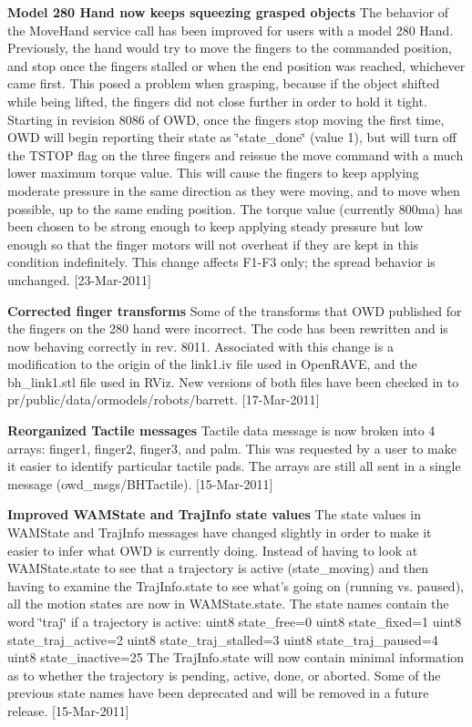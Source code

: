 {\bfseries Model 280 Hand now keeps squeezing grasped objects} The behavior of the Move\-Hand service call has been improved for users with a model 280 Hand. Previously, the hand would try to move the fingers to the commanded position, and stop once the fingers stalled or when the end position was reached, whichever came first. This posed a problem when grasping, because if the object shifted while being lifted, the fingers did not close further in order to hold it tight. Starting in revision 8086 of O\-W\-D, once the fingers stop moving the first time, O\-W\-D will begin reporting their state as \char`\"{}state\-\_\-done\char`\"{} (value 1), but will turn off the T\-S\-T\-O\-P flag on the three fingers and reissue the move command with a much lower maximum torque value. This will cause the fingers to keep applying moderate pressure in the same direction as they were moving, and to move when possible, up to the same ending position. The torque value (currently 800ma) has been chosen to be strong enough to keep applying steady pressure but low enough so that the finger motors will not overheat if they are kept in this condition indefinitely. This change affects F1-\/\-F3 only; the spread behavior is unchanged. \mbox{[}23-\/\-Mar-\/2011\mbox{]}

{\bfseries Corrected finger transforms} Some of the transforms that O\-W\-D published for the fingers on the 280 hand were incorrect. The code has been rewritten and is now behaving correctly in rev. 8011. Associated with this change is a modification to the origin of the link1.\-iv file used in Open\-R\-A\-V\-E, and the bh\-\_\-link1.\-stl file used in R\-Viz. New versions of both files have been checked in to pr/public/data/ormodels/robots/barrett. \mbox{[}17-\/\-Mar-\/2011\mbox{]}

{\bfseries Reorganized Tactile messages} Tactile data message is now broken into 4 arrays\-: finger1, finger2, finger3, and palm. This was requested by a user to make it easier to identify particular tactile pads. The arrays are still all sent in a single message (owd\-\_\-msgs/\-B\-H\-Tactile). \mbox{[}15-\/\-Mar-\/2011\mbox{]}

{\bfseries Improved W\-A\-M\-State and Traj\-Info state values} The state values in W\-A\-M\-State and Traj\-Info messages have changed slightly in order to make it easier to infer what O\-W\-D is currently doing. Instead of having to look at W\-A\-M\-State.\-state to see that a trajectory is active (state\-\_\-moving) and then having to examine the Traj\-Info.\-state to see what's going on (running vs. paused), all the motion states are now in W\-A\-M\-State.\-state. The state names contain the word \char`\"{}traj\char`\"{} if a trajectory is active\-: uint8 state\-\_\-free=0 uint8 state\-\_\-fixed=1 uint8 state\-\_\-traj\-\_\-active=2 uint8 state\-\_\-traj\-\_\-stalled=3 uint8 state\-\_\-traj\-\_\-paused=4 uint8 state\-\_\-inactive=25 The Traj\-Info.\-state will now contain minimal information as to whether the trajectory is pending, active, done, or aborted. Some of the previous state names have been deprecated and will be removed in a future release. \mbox{[}15-\/\-Mar-\/2011\mbox{]}

